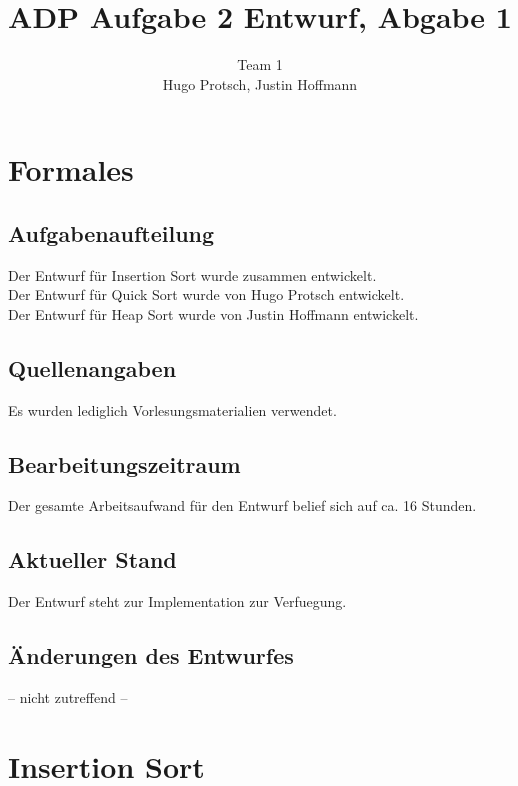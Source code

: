 \documentclass[11pt]{article}
\title{ADP Aufgabe 2 Entwurf, Abgabe 1}
\author{Team 1\\Hugo Protsch, Justin Hoffmann}
\begin{document}
    \maketitle

    \tableofcontents

    \newpage


    \section{Formales}\label{sec:Formales}


    \subsection*{Aufgabenaufteilung}
    Der Entwurf für Insertion Sort wurde zusammen entwickelt.\\
    Der Entwurf für Quick Sort wurde von Hugo Protsch entwickelt.\\
    Der Entwurf für Heap Sort wurde von Justin Hoffmann entwickelt.

    \subsection*{Quellenangaben}
    Es wurden lediglich Vorlesungsmaterialien verwendet.

    \subsection*{Bearbeitungszeitraum}
    Der gesamte Arbeitsaufwand für den Entwurf belief sich auf ca. 16 Stunden.


    \subsection*{Aktueller Stand}
    Der Entwurf steht zur Implementation zur Verfuegung.

    \subsection*{Änderungen des Entwurfes}
    -- nicht zutreffend --


    \section{Insertion Sort}\label{sec:insertion-sort}
\end{document}
